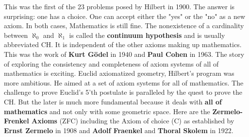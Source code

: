 \documentclass[12pt]{amsart}
\newcounter{example}    \def\example#1{ \item \fontsize{12}{15} \selectfont #1 \fontsize{12}{15} \selectfont }
\begin{document}
This was the first of the 23 problems posed by Hilbert in 1900. The answer is surprising: one has a choice.
One can accept either the "yes" or the "no" as a new axiom. In both cases, Mathematics is still fine. The nonexistence of a 
cardinality between $\aleph_0$ and $\aleph_1$ is called the {\bf continuum hypothesis} and is usually abbreviated CH. 
It is independent of the other axioms making up mathematics. 
This was the work of {\bf Kurt G\"odel} in 1940 and {\bf Paul Cohen} in 1963.
The story of exploring the consistency and completeness of axiom systems of all of mathematics is exciting. 
Euclid axiomatized geometry, Hilbert's program was more ambitious. He aimed at 
a set of axiom systems for all of mathematics. The challenge to prove Euclid's 5'th postulate
is paralleled by the quest to prove the CH. But the later is much more fundamental
because it deals with {\bf all of mathematics} and not only with some geometric space.
Here are the {\bf Zermelo-Frenkel Axioms} (ZFC) including the Axiom of choice (C) as established by 
{\bf Ernst Zermelo} in 1908 and {\bf Adolf Fraenkel} and {\bf Thoral Skolem} in 1922.  

\begin{small}
\end{small}
\end{document}
